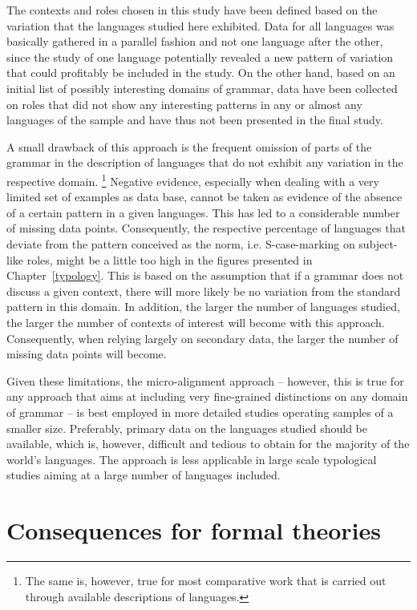 The contexts and roles chosen in this study have been defined based on the variation that the languages studied here exhibited. 
Data for all languages was basically gathered in a parallel fashion and not one language after the other, since the study of one language potentially revealed a new pattern of variation that could profitably be included in the study. 
On the other hand, based on an initial list of possibly interesting domains of grammar, data have been collected on roles that did not show any interesting patterns in any or almost any languages of the sample and have thus not been presented in the final study. 

A small drawback of this approach is the frequent omission of parts of the grammar in the description of languages that do not exhibit any variation in the respective domain.
\footnote{The same is, however, true for most comparative work that is carried out through available descriptions of languages.} 
Negative evidence, especially when dealing with a very limited set of examples as data base, cannot be taken as evidence of the absence of a certain pattern in a given languages. 
This has led to a considerable number of missing data points. Consequently, the respective percentage of languages that deviate from the pattern conceived as the norm, i.e. S-case-marking on subject-like roles, might be a little too high in the figures presented in Chapter~\ref{typology}. 
This is based on the assumption that if a grammar does not discuss a given context, there will more likely be no variation from the standard pattern in this domain.
In addition, the larger the number of languages studied, the larger the number of contexts of interest will become with this approach. 
Consequently, when relying largely on secondary data, the larger the number of missing data points will become. 

Given these limitations, the micro-alignment approach -- however, this is true for any approach that aims at including very fine-grained distinctions on any domain of grammar -- is best employed in more detailed studies operating samples of a smaller size. 
Preferably, primary data on the languages studied should be available, which is, however, difficult and tedious to obtain for the majority of the world's languages. 
The approach is less applicable in large scale typological studies aiming at a large number of languages included. 

\section{Consequences for formal theories}\label{consequencesformal}

